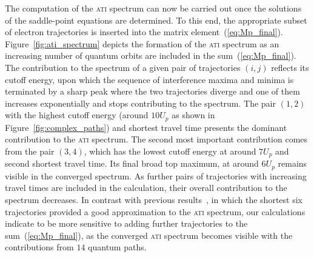 
The computation of the \textsc{ati} spectrum can now be carried out
once the solutions of the saddle-point equations are determined. To
this end, the appropriate subset of electron trajectories is inserted
into the matrix
element~(\ref{eq:Mp_final}). Figure~\ref{fig:ati_spectrum} depicts the
formation of the \textsc{ati} spectrum as an increasing number of
quantum orbits are included in the sum~(\ref{eq:Mp_final}). The
contribution to the spectrum of a given pair of trajectories $(i,j)$
reflects its cutoff energy, upon which the sequence of interference
maxima and minima is terminated by a sharp peak where the two
trajectories diverge and one of them increases exponentially and stops
contributing to the spectrum. The pair $(1,2)$ with the highest cutoff
energy (around $10 U_{p}$ as shown in Figure~\ref{fig:complex_paths})
and shortest travel time presents the dominant contribution to the
\textsc{ati} spectrum. The second most important contribution comes
from the pair $(3,4)$, which has the lowest cutoff energy at around $7
U_{p}$ and second shortest travel time. Its final broad top maximum,
at around $6 U_{p}$ remains visible in the converged spectrum. As
further pairs of trajectories with increasing travel times are
included in the calculation, their overall contribution to the
spectrum decreases. In contrast with previous
results~\cite{KopoldOptComm2000}, in which the shortest six
trajectories provided a good approximation to the \textsc{ati}
spectrum, our calculations indicate to be more sensitive to adding
further trajectories to the sum~(\ref{eq:Mp_final}), as the converged
\textsc{ati} spectrum becomes visible with the contributions from $14$
quantum paths.






